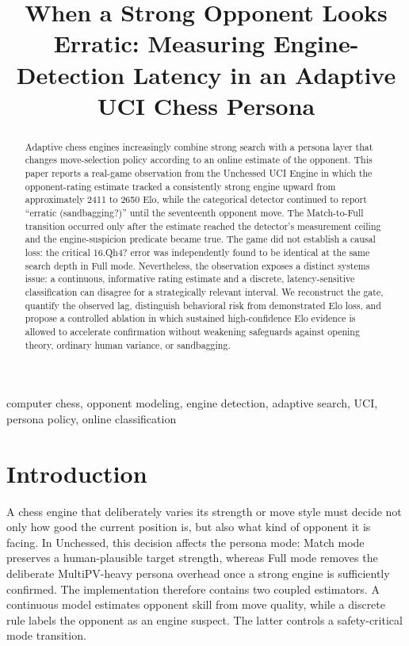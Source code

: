 \documentclass[conference]{IEEEtran}
\title{When a Strong Opponent Looks Erratic: Measuring Engine-Detection Latency in an Adaptive UCI Chess Persona}
\author{\IEEEauthorblockN{Manus AI}
\IEEEauthorblockA{Independent Research Report\\
September 2026}}
\begin{document}
\maketitle

\begin{abstract}
Adaptive chess engines increasingly combine strong search with a persona layer that changes move-selection policy according to an online estimate of the opponent. This paper reports a real-game observation from the Unchessed UCI Engine in which the opponent-rating estimate tracked a consistently strong engine upward from approximately 2411 to 2650 Elo, while the categorical detector continued to report ``erratic (sandbagging?)'' until the seventeenth opponent move. The Match-to-Full transition occurred only after the estimate reached the detector's measurement ceiling and the engine-suspicion predicate became true. The game did not establish a causal loss: the critical 16.Qh4? error was independently found to be identical at the same search depth in Full mode. Nevertheless, the observation exposes a distinct systems issue: a continuous, informative rating estimate and a discrete, latency-sensitive classification can disagree for a strategically relevant interval. We reconstruct the gate, quantify the observed lag, distinguish behavioral risk from demonstrated Elo loss, and propose a controlled ablation in which sustained high-confidence Elo evidence is allowed to accelerate confirmation without weakening safeguards against opening theory, ordinary human variance, or sandbagging.
\end{abstract}

\begin{IEEEkeywords}
computer chess, opponent modeling, engine detection, adaptive search, UCI, persona policy, online classification
\end{IEEEkeywords}

\section{Introduction}
A chess engine that deliberately varies its strength or move style must decide not only how good the current position is, but also what kind of opponent it is facing. In Unchessed, this decision affects the persona mode: Match mode preserves a human-plausible target strength, whereas Full mode removes the deliberate MultiPV-heavy persona overhead once a strong engine is sufficiently confirmed. The implementation therefore contains two coupled estimators. A continuous model estimates opponent skill from move quality, while a discrete rule labels the opponent as an engine suspect. The latter controls a safety-critical mode transition.
\end{document}
